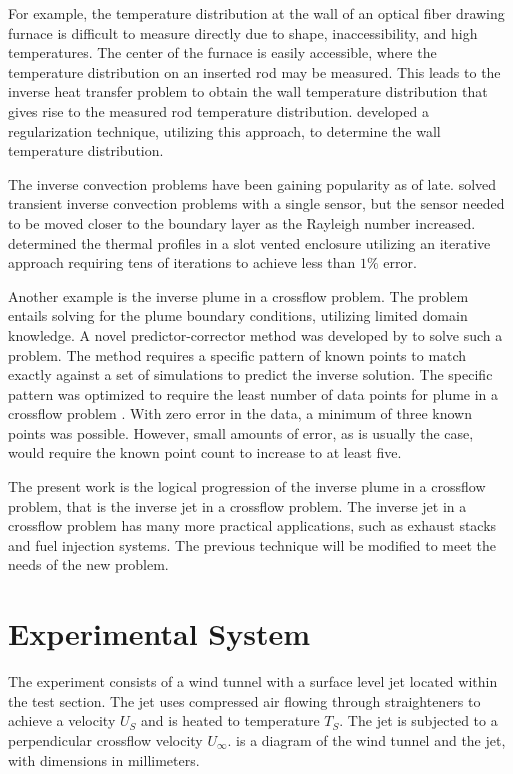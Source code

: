 \documentclass[preprint,12pt]{elsarticle}
\begin{document}
For example, the temperature distribution at the wall of an optical fiber drawing furnace is difficult to measure directly due to shape, inaccessibility, and high temperatures.  The center of the furnace is easily accessible, where the temperature distribution on an inserted rod may be measured. This leads to the inverse heat transfer problem to obtain the wall temperature distribution that gives rise to the measured rod temperature distribution.   developed a regularization technique, utilizing this approach, to determine the wall temperature distribution.

The inverse convection problems have been gaining popularity as of late.   solved transient inverse convection problems with a single sensor, but the sensor needed to be moved closer to the boundary layer as the Rayleigh number increased.   determined the thermal profiles in a slot vented enclosure utilizing an iterative approach requiring tens of iterations to achieve less than $1\%$ error.

Another example is the inverse plume in a crossflow problem.  The problem entails solving for the plume boundary conditions, utilizing limited domain knowledge.  A novel predictor-corrector method was developed by \citet{ijhmt1} to solve such a problem.  The method requires a specific pattern of known points to match exactly against a set of simulations to predict the inverse solution.  The specific pattern was optimized to require the least number of data points for plume in a crossflow problem \cite{ijhmt2}.  With zero error in the data, a minimum of three known points was possible.  However, small amounts of error, as is usually the case, would require the known point count to increase to at least five.

The present work is the logical progression of the inverse plume in a crossflow problem, that is the inverse jet in a crossflow problem.  The inverse jet in a crossflow problem has many more practical applications, such as exhaust stacks and fuel injection systems.  The previous technique will be modified to meet the needs of the new problem.


\section{Experimental System}
The experiment consists of a wind tunnel with a surface level jet located within the test section.  The jet uses compressed air flowing through straighteners to achieve a velocity $U_S$ and is heated to temperature $T_S$.  The jet is subjected to a perpendicular crossflow velocity $U_{\infty}$.   is a diagram of the wind tunnel and the jet, with dimensions in millimeters.
\end{document}
